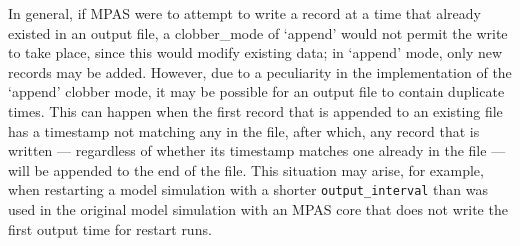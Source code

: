 \vspace{12pt}
 \newline
\hspace*{\mutindent}{\tt type="output"} \newline
\hspace*{\mutindent}{\tt filename\_template="diagnostics.\$Y-\$M.nc"} \newline
\hspace*{\mutindent}{\tt filename\_interval="01-00\_00:00:00"} \newline
\hspace*{\mutindent}{\tt precision="single"} \newline
\hspace*{\mutindent}{\tt clobber\_mode="append"} \newline
\hspace*{\mutindent}{\tt output\_interval="6:00:00" />} \newline
\newline
\hspace*{1cm}{\tt <var name="u10"/>} \newline
\hspace*{1cm}{\tt <var name="v10"/>} \newline
\hspace*{1cm}{\tt <var name="t2"/>} \newline
\hspace*{1cm}{\tt <var name="q2"/>} \newline
\newline
{} \newline
\vspace{12pt}

In general, if MPAS were to attempt to write a record at a time that already existed in an output file, a clobber\_mode 
of `append' would not permit the write to take place, since this would modify existing data; in `append' mode, only new
records may be added. However, due to a peculiarity in the implementation of the `append' clobber mode, it may be 
possible for an output file to contain duplicate times. This can happen when the first record that is appended to 
an existing file has a timestamp not matching any in the file, after which, any record that is written --- regardless of 
whether its timestamp matches one already in the file --- will be appended to the end of the file. This situation may arise, 
for example, when restarting a model simulation with a shorter {\tt output\_interval} than was used in the original model simulation 
with an MPAS core that does not write the first output time for restart runs.

